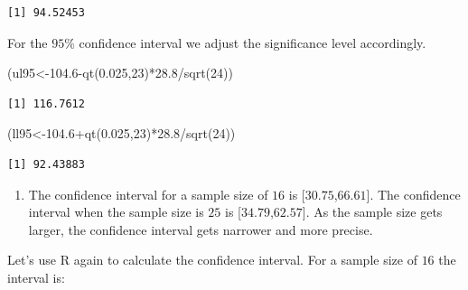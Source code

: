 \documentclass[
  letterpaper,
  DIV=11,
  numbers=noendperiod]{scrreprt}
\newenvironment{Shaded}{\begin{snugshade}}{\end{snugshade}}
\newcommand{\DecValTok}[1]{\textcolor[rgb]{0.68,0.00,0.00}{#1}}
\newcommand{\FloatTok}[1]{\textcolor[rgb]{0.68,0.00,0.00}{#1}}
\newcommand{\FunctionTok}[1]{\textcolor[rgb]{0.28,0.35,0.67}{#1}}
\newcommand{\NormalTok}[1]{\textcolor[rgb]{0.00,0.23,0.31}{#1}}
\newcommand{\OtherTok}[1]{\textcolor[rgb]{0.00,0.23,0.31}{#1}}
\newcommand{\SpecialCharTok}[1]{\textcolor[rgb]{0.37,0.37,0.37}{#1}}
\providecommand{\tightlist}{%
  \setlength{\itemsep}{0pt}\setlength{\parskip}{0pt}}\usepackage{longtable,booktabs,array}
\begin{document}
\begin{verbatim}
[1] 94.52453
\end{verbatim}

For the \(95\)\% confidence interval we adjust the significance level
accordingly.

\begin{Shaded}
\begin{Highlighting}[numbers=left,,]
\NormalTok{(ul95}\OtherTok{\textless{}{-}}\FloatTok{104.6}\SpecialCharTok{{-}}\FunctionTok{qt}\NormalTok{(}\FloatTok{0.025}\NormalTok{,}\DecValTok{23}\NormalTok{)}\SpecialCharTok{*}\FloatTok{28.8}\SpecialCharTok{/}\FunctionTok{sqrt}\NormalTok{(}\DecValTok{24}\NormalTok{))}
\end{Highlighting}
\end{Shaded}

\begin{verbatim}
[1] 116.7612
\end{verbatim}

\begin{Shaded}
\begin{Highlighting}[numbers=left,,]
\NormalTok{(ll95}\OtherTok{\textless{}{-}}\FloatTok{104.6}\SpecialCharTok{+}\FunctionTok{qt}\NormalTok{(}\FloatTok{0.025}\NormalTok{,}\DecValTok{23}\NormalTok{)}\SpecialCharTok{*}\FloatTok{28.8}\SpecialCharTok{/}\FunctionTok{sqrt}\NormalTok{(}\DecValTok{24}\NormalTok{))}
\end{Highlighting}
\end{Shaded}

\begin{verbatim}
[1] 92.43883
\end{verbatim}

\begin{blackbox}

\begin{enumerate}
\def\labelenumi{\arabic{enumi}.}
\setcounter{enumi}{1}
\tightlist
\item
  The confidence interval for a sample size of \(16\) is
  {[}\(30.75\),\(66.61\){]}. The confidence interval when the sample
  size is \(25\) is {[}\(34.79\),\(62.57\){]}. As the sample size gets
  larger, the confidence interval gets narrower and more precise.
\end{enumerate}

\end{blackbox}

Let's use R again to calculate the confidence interval. For a sample
size of \(16\) the interval is:
\end{document}
